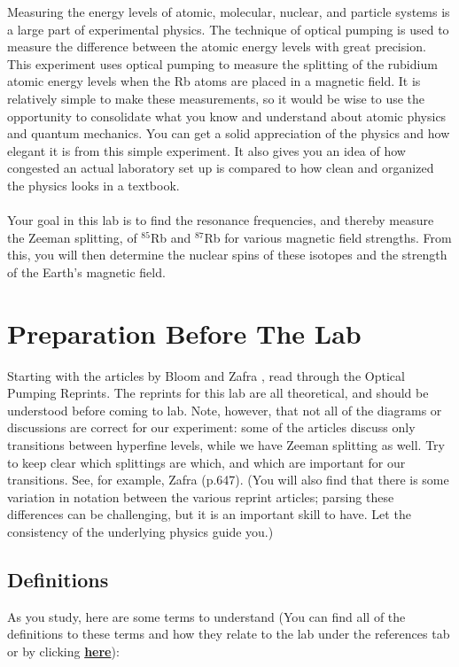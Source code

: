 \documentclass{../lab}
\newcommand{\DefinitionsOPT}{http://experimentationlab.berkeley.edu/definitionsopt}
\begin{document}
Measuring the energy levels of atomic, molecular, nuclear, and particle systems is a large part of experimental physics. The technique of optical pumping is used to measure the difference between the atomic energy levels with great precision. This experiment uses optical pumping to measure the splitting of the rubidium atomic energy levels when the Rb atoms are placed in a magnetic field. It is relatively simple to make these measurements, so it would be wise to use the opportunity to consolidate what you know and understand about atomic physics and quantum mechanics. You can get a solid appreciation of the physics and how elegant it is from this simple experiment. It also gives you an idea of how congested an actual laboratory set up is compared to how clean and organized the physics looks in a textbook. \\\\
Your goal in this lab is to find the resonance frequencies, and thereby measure the Zeeman splitting, of $^{85}$Rb and $^{87}$Rb for various magnetic field strengths. From this, you will then determine the nuclear spins of these isotopes and the strength of the Earth's magnetic field.

\section{Preparation Before The Lab}

Starting with the articles by Bloom \cite{Bloom} and Zafra \cite{Zafra}, read through the Optical Pumping Reprints. The reprints for this lab are all theoretical, and should be understood before coming to lab. Note, however, that not all of the diagrams or discussions are correct for our experiment: some of the articles discuss only transitions between hyperfine levels, while we have Zeeman splitting as well. Try to keep clear which splittings are which, and which are important for our transitions. See, for example, Zafra \cite{Zafra} (p.647). (You will also find that there is some variation in notation between the various reprint articles; parsing these differences can be challenging, but it is an important skill to have. Let the consistency of the underlying physics guide you.)

\subsection{Definitions}

As you study, here are some terms to understand (You can find all of the definitions to these terms and how they relate to the lab under the references tab or by clicking \href{\DefinitionsOPT}{\textbf{here}}):
\end{document}
